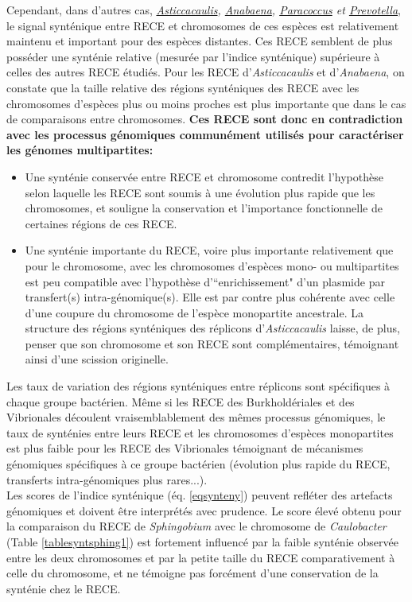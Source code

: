 	Cependant, dans d'autres cas, \textit{\hyperref[parasti]{Asticcacaulis}, \hyperref[paranab]{Anabaena}, \hyperref[parpara]{Paracoccus} et \hyperref[parprev]{Prevotella}}, le signal synténique entre RECE et chromosomes de ces espèces est relativement maintenu et important pour des espèces distantes. Ces RECE semblent de plus posséder une synténie relative (mesurée par l'indice synténique) supérieure à celles des autres RECE étudiés. Pour les RECE d'\textit{Asticcacaulis} et d'\textit{Anabaena}, on constate que la taille relative des régions synténiques des RECE avec les chromosomes d'espèces plus ou moins proches est plus importante que dans le cas de comparaisons entre chromosomes. \textbf{\color{orange} Ces RECE sont donc en contradiction avec les processus génomiques communément utilisés pour caractériser les génomes multipartites:}
\begin{itemize}
	\item Une synténie conservée entre RECE et chromosome contredit l'hypothèse selon laquelle les RECE sont soumis à une évolution plus rapide que les chromosomes, et souligne la conservation et l'importance fonctionnelle de certaines régions de ces RECE. 
	\item Une synténie importante du RECE, voire plus importante relativement que pour le chromosome, avec les chromosomes d'espèces mono- ou multipartites est peu compatible avec l'hypothèse d'``enrichissement" d'un plasmide par transfert(s) intra-génomique(s). Elle est par contre plus cohérente avec celle d'une coupure du chromosome de l'espèce monopartite ancestrale. La structure des régions synténiques des réplicons d'\textit{Asticcacaulis} laisse, de plus, penser que son chromosome et son RECE sont complémentaires, témoignant ainsi d'une scission originelle.
\end{itemize}
	Les taux de variation des régions synténiques entre réplicons sont spécifiques à chaque groupe bactérien. Même si les RECE des Burkholdériales et des Vibrionales découlent vraisemblablement des mêmes processus génomiques, le taux de synténies entre leurs RECE et les chromosomes d'espèces monopartites est plus faible pour les RECE des Vibrionales témoignant de mécanismes génomiques spécifiques à ce groupe bactérien (évolution plus rapide du RECE, transferts intra-génomiques plus rares...).\\
 Les scores de l'indice synténique (éq. \ref{eqsynteny}) peuvent refléter des artefacts génomiques et doivent être interprétés avec prudence. Le score élevé obtenu pour la comparaison du RECE de \textit{Sphingobium} avec le chromosome de \textit{Caulobacter} (Table \ref{tablesyntsphing1}) est fortement influencé par la faible synténie observée entre les deux chromosomes et par la petite taille du RECE comparativement à celle du chromosome, et ne témoigne pas forcément d'une conservation de la synténie chez le RECE.\\
